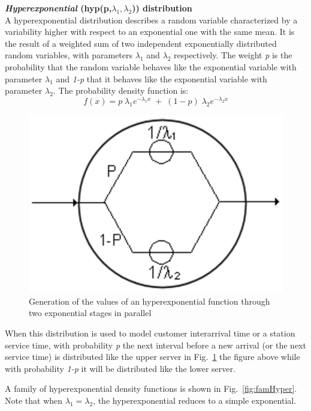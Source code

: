 \textbf{\emph{Hyperexponential} (hyp(p,$\lambda_1,\lambda_2$))
distribution}\\
A hyperexponential distribution describes a random variable
characterized by a variability higher with respect to an
exponential one with the same mean. It is the result of a weighted
sum of two independent exponentially distributed random variables,
with parameters $\lambda_1$ and $\lambda_2$ respectively. The
weight \emph{p} is the probability  that the random variable
behaves like the exponential variable with parameter $\lambda_1$
and \emph{1-p} that it behaves like the exponential variable with
parameter $\lambda_2$. The probability density function is:
\[ f(x) = p \; \lambda_1 e^{- \lambda_1 x}\; + \;
(1-p) \; \lambda_2 e^{- \lambda_2 x}
\]
\begin{figure}[htb]
    \begin{center}
        \includegraphics[scale=.5]{img/jsimg/4.7.eps}
    \end{center}
    \caption{Generation of the values of an hyperexponential function
    through two exponential stages in parallel}
    \label{fig:genHyper}
\end{figure}
When this distribution is used to model customer interarrival time
or a station service time, with probability \emph{p} the next
interval before a new arrival (or the next service time) is
distributed like the upper server in Fig.~\ref{fig:genHyper} the
figure above while with probability \emph{1-p} it will be
distributed like the lower server.

A family of hyperexponential density functions is shown in
Fig.~\ref{fig:famHyper}. Note that when $\lambda_1 = \lambda_2$,
the hyperexponential reduces to a simple exponential.\\


